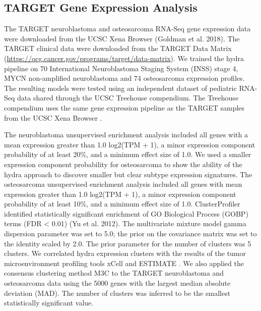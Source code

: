 \documentclass[10pt,letterpaper]{article}
\begin{document}

\subsection{TARGET Gene Expression Analysis}
The TARGET neuroblastoma and osteosarcoma RNA-Seq gene expression data were downloaded from the UCSC Xena Browser (Goldman et al. 2018). The TARGET clinical data were downloaded from the TARGET Data Matrix (\url{https://ocg.cancer.gov/programs/target/data-matrix}). We trained the hydra pipeline on 70 International Neuroblastoma Staging System (INSS) stage 4, MYCN non-amplified neuroblastoma and 74 osteosarcoma expression profiles. The resulting models were tested using an independent dataset of pediatric RNA-Seq data shared through the UCSC Treehouse compendium. The Treehouse compendium uses the same gene expression pipeline as the TARGET samples from the UCSC Xena Browser \cite{vivianToilEnablesReproducible2017}.
 
The neuroblastoma unsupervised enrichment analysis included all genes with a mean expression greater than 1.0 log2(TPM + 1), a minor expression component probability of at least 20\%, and a minimum effect size of 1.0. We used a smaller expression component probability for osteosarcoma to show the ability of the hydra approach to discover smaller but clear subtype expression signatures. The osteosarcoma unsupervised enrichment analysis included all genes with mean expression greater than 1.0 log2(TPM + 1), a minor expression component probability of at least 10\%, and a minimum effect size of 1.0. ClusterProfiler identified statistically significant enrichment of GO Biological Process (GOBP) terms (FDR < 0.01) (Yu et al. 2012). The multivariate mixture model gamma dispersion parameter was set to 5.0; the prior on the covariance matrix was set to the identity scaled by 2.0. The prior parameter for the number of clusters was 5 clusters. We correlated hydra expression clusters with the results of the tumor microenvironment profiling tools xCell \cite{aranXCellDigitallyPortraying2017} and ESTIMATE \cite{yoshiharaInferringTumourPurity2013}. We also applied the consensus clustering method M3C \cite{johnM3CMonteCarlo2018} to the TARGET neuroblastoma and osteosarcoma data using the 5000 genes with the largest median absolute deviation (MAD). The number of clusters was inferred to be the smallest statistically significant value.
\end{document}
